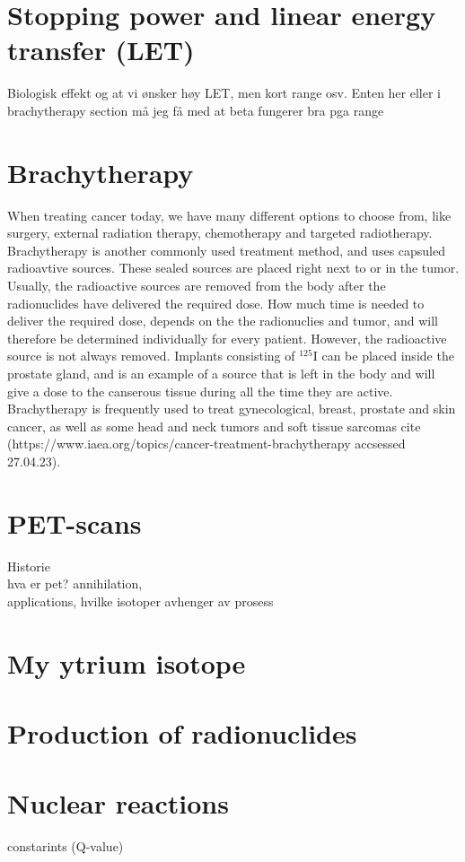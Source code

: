 \section{Stopping power and linear energy transfer (LET)}
Biologisk effekt og at vi ønsker høy LET, men kort range osv. Enten her eller i brachytherapy section må jeg få med at beta fungerer bra pga range

\section{Brachytherapy}
When treating cancer today, we have many different options to choose from, like surgery, external radiation therapy, chemotherapy and targeted radiotherapy. Brachytherapy is another commonly used treatment method, and uses capsuled radioavtive sources. These sealed sources are placed right next to or in the tumor. Usually, the radioactive sources are removed from the body after the radionuclides have delivered the required dose. How much time is needed to deliver the required dose, depends on the the radionuclies and tumor, and will therefore be determined individually for every patient. However, the radioactive source is not always removed. Implants consisting of $^{125}$I can be placed inside the prostate gland, and is an example of a source that is left in the body and will give a dose to the canserous tissue during all the time they are active. Brachytherapy is frequently used to treat gynecological, breast, prostate and skin cancer, as well as some head and neck tumors and soft tissue sarcomas cite (https://www.iaea.org/topics/cancer-treatment-brachytherapy accsessed 27.04.23).



\section{PET-scans}
Historie
\vspace{3mm}
\\
hva er pet? annihilation, 
\vspace{3mm}
\\
applications, hvilke isotoper avhenger av prosess



\section{My ytrium isotope}

\section{Production of radionuclides}
\section{Nuclear reactions}
constarints (Q-value)

